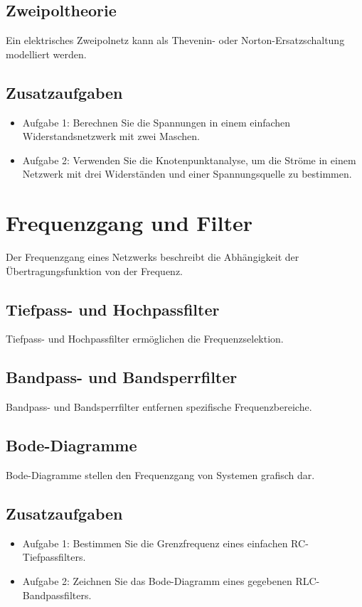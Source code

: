 \documentclass[11pt,a4paper]{article}
\begin{document}
\subsection{Zweipoltheorie}
Ein elektrisches Zweipolnetz kann als Thevenin- oder Norton-Ersatzschaltung modelliert werden.

\subsection{Zusatzaufgaben}
\begin{itemize}
    \item Aufgabe 1: Berechnen Sie die Spannungen in einem einfachen Widerstandsnetzwerk mit zwei Maschen.
    \item Aufgabe 2: Verwenden Sie die Knotenpunktanalyse, um die Ströme in einem Netzwerk mit drei Widerständen und einer Spannungsquelle zu bestimmen.
\end{itemize}
\vspace{1cm}
\section{Frequenzgang und Filter}
Der Frequenzgang eines Netzwerks beschreibt die Abhängigkeit der Übertragungsfunktion von der Frequenz.

\subsection{Tiefpass- und Hochpassfilter}
Tiefpass- und Hochpassfilter ermöglichen die Frequenzselektion.

\subsection{Bandpass- und Bandsperrfilter}
Bandpass- und Bandsperrfilter entfernen spezifische Frequenzbereiche.

\subsection{Bode-Diagramme}
Bode-Diagramme stellen den Frequenzgang von Systemen grafisch dar.

\subsection{Zusatzaufgaben}
\begin{itemize}
    \item Aufgabe 1: Bestimmen Sie die Grenzfrequenz eines einfachen RC-Tiefpassfilters.
    \item Aufgabe 2: Zeichnen Sie das Bode-Diagramm eines gegebenen RLC-Bandpassfilters.
\end{itemize}
\end{document}
